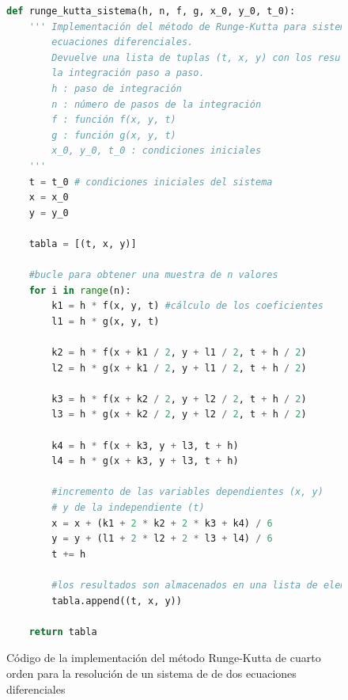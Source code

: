 \documentclass[11pt]{article}
\begin{document}
\begin{figure}
\begin{lstlisting}[language=Python]
def runge_kutta_sistema(h, n, f, g, x_0, y_0, t_0):
	''' Implementación del método de Runge-Kutta para sistemas de dos
		ecuaciones diferenciales.
		Devuelve una lista de tuplas (t, x, y) con los resultados de
		la integración paso a paso.
		h : paso de integración
		n : número de pasos de la integración
		f : función f(x, y, t)
		g : función g(x, y, t)
		x_0, y_0, t_0 : condiciones iniciales
 	'''
	t = t_0 # condiciones iniciales del sistema
	x = x_0
	y = y_0

	tabla = [(t, x, y)]

	#bucle para obtener una muestra de n valores
	for i in range(n):
		k1 = h * f(x, y, t) #cálculo de los coeficientes
		l1 = h * g(x, y, t)

		k2 = h * f(x + k1 / 2, y + l1 / 2, t + h / 2)
		l2 = h * g(x + k1 / 2, y + l1 / 2, t + h / 2)

		k3 = h * f(x + k2 / 2, y + l2 / 2, t + h / 2)
		l3 = h * g(x + k2 / 2, y + l2 / 2, t + h / 2)

		k4 = h * f(x + k3, y + l3, t + h)
		l4 = h * g(x + k3, y + l3, t + h)

		#incremento de las variables dependientes (x, y)
		# y de la independiente (t)
		x = x + (k1 + 2 * k2 + 2 * k3 + k4) / 6
		y = y + (l1 + 2 * l2 + 2 * l3 + l4) / 6
		t += h

		#los resultados son almacenados en una lista de elementos (t, x, y)
		tabla.append((t, x, y))

	return tabla
\end{lstlisting}
\caption{Código de la implementación del método Runge-Kutta de cuarto orden para la resolución de un sistema de de dos ecuaciones diferenciales}
\label{runge_kutta_code}
\end{figure}
\end{document}

